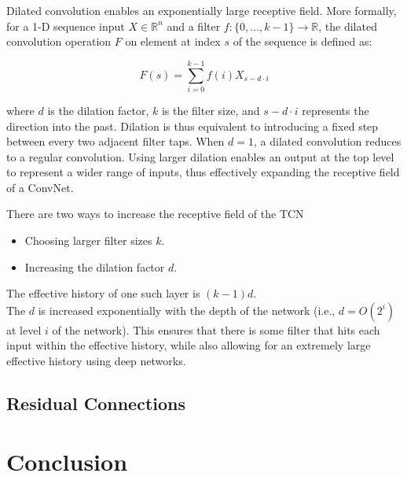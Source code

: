 \documentclass[12pt, titlepage]{article}
\begin{document}
Dilated convolution enables an exponentially large receptive field. More formally, for a 1-D sequence input $X \in \mathbb{R}^n$ and a filter $f:\{0, \dots , k - 1\} \rightarrow \mathbb{R}$, the dilated convolution operation $F$ on element at index $s$ of the sequence is defined as:

\begin{equation}
F(s) = \sum_{i=0}^{k-1}{f(i)X_{s - d \cdot i}}
\end{equation}

where $d$ is the dilation factor, $k$ is the filter size, and $s - d \cdot i$ represents the direction into the past. Dilation is thus equivalent to introducing a fixed step between every two adjacent filter taps. When $d=1$, a dilated convolution reduces to a regular convolution. Using larger dilation enables an output at the top level to represent a wider range of inputs, thus effectively expanding the receptive field of a ConvNet.

There are two ways to increase the receptive field of the TCN
\begin{itemize}
\item Choosing larger filter sizes $k$.
\item Increasing the dilation factor $d$.
\end{itemize}
The effective history of one such layer is
$(k - 1)d$. \\

The $d$ is increased exponentially with the depth of the network (i.e., $d = O(2^i)$ at level $i$ of the network). This ensures that there is some filter that hits each input within the effective history, while also allowing for an extremely large effective history using deep networks.

\subsection{Residual Connections}



\section{Conclusion}
\end{document}
